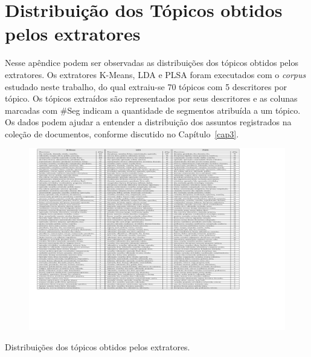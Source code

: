 \chapter{ Distribuição dos Tópicos obtidos pelos extratores}\label{apendice3}




Nesse apêndice podem ser observadas as distribuições dos tópicos obtidos pelos extratores.
Os extratores K-Means, LDA e PLSA foram executados com o \textit{corpus} estudado neste trabalho, do qual extraiu-se 70 tópicos com 5 descritores por tópico. Os tópicos extraídos são representados por seus descritores e as colunas marcadas com \#Seg indicam a quantidade de segmentos atribuída a um tópico.
Os dados podem ajudar a entender a distribuição dos assuntos registrados na coleção de documentos, conforme discutido no Capítulo~\ref{cap3}.

\begin{landscape}%







\begin{figure}[h]
\center
	\includegraphics[trim={ 40 600 200 0 }, page=1,width=1.2\textwidth]{anexos/tabelas/distribuicao-topicos/distribuicao-topicos.pdf}
\end{figure}





\begin{table}[b]
	\caption{Distribuições dos tópicos obtidos pelos extratores.}
\end{table}




\end{landscape}

